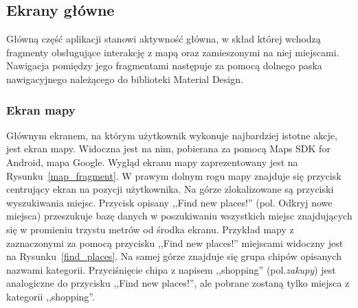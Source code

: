 \newpage
    \subsection{Ekrany główne}
    Główną część aplikacji stanowi aktywność główna, w skład której wchodzą fragmenty obsługujące interakcję z mapą oraz zamieszonymi na niej miejscami.
    Nawigacja pomiędzy jego fragmentami następuje za pomocą dolnego paska nawigacyjnego należącego do biblioteki Material Design.

        \subsubsection{Ekran mapy}
        Głównym ekranem, na którym użytkownik wykonuje najbardziej istotne akcje, jest ekran mapy. Widoczna jest na nim, pobierana za pomocą Maps SDK for Android, mapa Google.
        Wygląd ekranu mapy zaprezentowany jest na Rysunku~\ref{map_fragment}. W prawym dolnym rogu mapy znajduje się przycisk centrujący ekran na pozycji użytkownika. Na górze 
        zlokalizowane są przyciski wyszukiwania miejsc. Przycisk opisany ,,Find new places!'' (pol. Odkryj nowe miejsca) przeszukuje bazę danych w poszukiwaniu wszystkich miejsc 
        znajdujących się w promieniu trzystu metrów od środka ekranu. Przykład mapy z zaznaczonymi za pomocą przycisku ,,Find new places!'' miejscami widoczny jest na Rysunku~\ref{find_places}.
        Na samej górze znajduje się grupa chipów opisanych nazwami kategorii. Przyciśnięcie chipa z napisem ,,shopping'' (pol.\@ \emph{zakupy}) jest analogiczne do przycisku ,,Find new places!'', ale pobrane
        zostaną tylko miejsca z kategorii ,,shopping''. 

